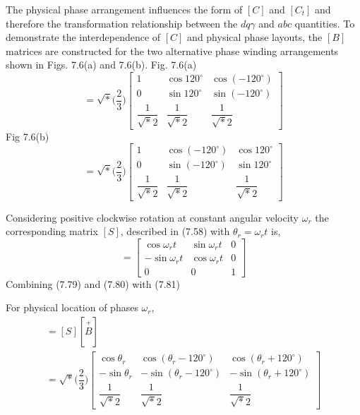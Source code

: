 \documentclass[a4paper,numbers=noenddot,12pt]{scrbook}
\begin{document}
    The physical phase arrangement influences the form of $[C]$ and $[C_t]$ and therefore the transformation relationship between the $d q \gamma$ and $abc$ quantities. To demonstrate the interdependence of $[C]$ and physical phase layouts, the $[B]$ matrices are constructed for the two alternative phase winding arrangements shown in Figs. 7.6(a) and 7.6(b).
    Fig. 7.6(a)
    \begin{equation}
        [\overset{+}{B}] = \sqrt*{\Big(\dfrac{2}{3} \Big)}
        \begin{bmatrix}
            1 & \cos 120^{\circ} & \cos (-120^{\circ}) \\
            0 & \sin 120^{\circ} & \sin (-120^{\circ}) \\
            \dfrac{1}{\sqrt*{2}} & \dfrac{1}{\sqrt*{2}} & \dfrac{1}{\sqrt*{2}}
        \end{bmatrix}
        \label{eq:Eq7.79}
    \end{equation}
    Fig 7.6(b)
    \begin{equation}
        [\overset{-}{B}] = \sqrt*{\Big(\dfrac{2}{3} \Big)}
        \begin{bmatrix}
            1 & \cos (- 120^{\circ}) & \cos 120^{\circ} \\
            0 & \sin (- 120^{\circ}) & \sin 120^{\circ} \\
            \dfrac{1}{\sqrt*{2}} & \dfrac{1}{\sqrt*{2}} & \dfrac{1}{\sqrt*{2}}
        \end{bmatrix}
        \label{eq:Eq7.80}
    \end{equation}

    Considering positive clockwise rotation at constant angular velocity $\omega_r$ the corresponding matrix $[S]$, described in (7.58) with  $\theta_r = \omega_r t$ is,
    \begin{equation}
        [S] = 
        \begin{bmatrix}
            \cos \omega_r t & \sin \omega_r t & 0 \\
            - \sin \omega_r t  & \cos \omega_r t & 0 \\
            0 & 0 & 1
        \end{bmatrix}
        \label{eq:Eq7.81}
    \end{equation}
    Combining (7.79) and (7.80) with (7.81)

    For physical location of phases $\omega_r$,
    \begin{multline}
        [\overset{+}{C}] = [S] [\overset{+}{B}] \\
        = \sqrt*{\Big( \dfrac{2}{3} \Big)}
        \begin{bmatrix}
            \cos \theta_r & \cos (\theta_r - 120^{\circ}) & \cos (\theta_r + 120^{\circ}) \\
            - \sin \theta_r & - \sin (\theta_r - 120^{\circ}) & - \sin (\theta_r + 120^{\circ}) \\
            \dfrac{1}{\sqrt*{2}} & \dfrac{1}{\sqrt*{2}} & \dfrac{1}{\sqrt*{2}}
        \end{bmatrix}
        \label{eq:Eq7.82}
    \end{multline}
\end{document}
